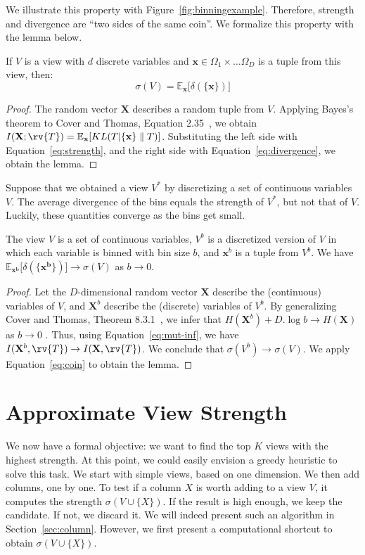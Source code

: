 We illustrate this property with Figure~\ref{fig:binningexample}.  Therefore,
strength and divergence are ``two sides of the same coin''. We formalize this
property with the lemma below.
\begin{lemma}
    If $V$ is a view with $d$ discrete variables and $\mathbf{x} \in \Omega_1
    \times \ldots \Omega_D$ is a tuple from this view, then:
    \begin{equation}\label{eq:coin}
        \sigma(V) = \mathbb{E}_{\mathbf{x}}  \big[ \delta(\{\mathbf{x}\}) \big]
    \end{equation}
\end{lemma}
\begin{proof}
    The random vector $\mathbf{X}$ describes a random tuple from $V$.
    Applying Bayes's theorem to Cover and Thomas, Equation
    2.35~\cite{cover2012elements}, we obtain $ I(\mathbf{X} ; \rv{T})
    =\mathbb{E}_{\mathbf{x}}[ KL( T | \{\mathbf{x}\} \parallel T )]$.
    Substituting the left side with Equation~\ref{eq:strength}, and the right
    side with Equation~\ref{eq:divergence}, we obtain the lemma.
\end{proof}
Suppose that we obtained a view $V^*$ by discretizing a set of continuous
variables $V$. The average divergence of the bins equals the strength of $V^*$,
but not that of $V$. Luckily, these quantities converge as the bins get small.
\begin{lemma}
    The view $V$ is a set of continuous variables, $V^b$ is a discretized
    version of $V$ in which each variable is binned with bin size $b$, and
    $\mathbf{x}^b$ is a tuple from $V^b$. We have $\mathbb{E}_{\mathbf{x^b}}
    \big[ \delta(\{\mathbf{x^b}\}) \big] \to  \sigma(V)$ as $b \to 0$.
\end{lemma}
\begin{proof}
    Let the $D$-dimensional random vector $\mathbf{X}$ describe the
    (continuous) variables of $V$, and $\mathbf{X}^b$ describe the (discrete)
    variables of $V^b$. By generalizing Cover and Thomas, Theorem
    8.3.1~\cite{cover2012elements}, we infer that $H(\mathbf{X}^b) + D.\log{b}
    \to H(\mathbf{X})$ as $b \to 0$ .  Thus, using Equation~\ref{eq:mut-inf},
    we have $I(\mathbf{X}^b, \rv{T}) \to I(\mathbf{X}, \rv{T})$. We conclude
    that $\sigma(V^b) \to \sigma(V)$. We apply Equation~\ref{eq:coin} to obtain
    the lemma.
\end{proof}


\section{Approximate View Strength}
\label{sec:approximate}
We now have a formal objective: we want to find the top $K$ views with the
highest strength. At this point, we could easily envision a greedy heuristic to
solve this task. We start with simple views, based on one dimension. We then
add columns, one by one.  To test if a column $X$ is worth adding to a view
$V$, it computes the strength $\sigma(V \cup \{X\})$. If the result is high
enough, we keep the candidate. If not, we discard it. We will indeed present
such an algorithm in Section~\ref{sec:column}. However, we first present a
computational shortcut to obtain $\sigma(V \cup \{X\})$.

